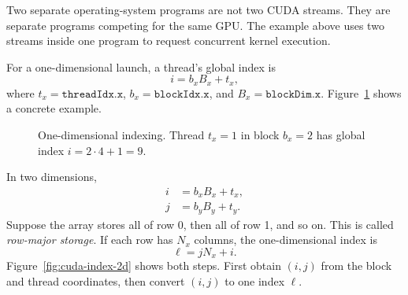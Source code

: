\documentclass[11pt]{article}
\numberwithin{equation}{section}
\numberwithin{figure}{section}
\numberwithin{table}{section}
\newcommand{\code}[1]{\texttt{#1}}
\begin{document}
Two separate operating-system programs are not two CUDA streams.  They are separate
programs competing for the same GPU.  The example above uses two streams inside one
program to request concurrent kernel execution.

For a one-dimensional launch, a thread's global index is
\begin{equation}
  i=b_xB_x+t_x,
  \label{eq:chapter-global-index-1d}
\end{equation}
where $t_x=\code{threadIdx.x}$, $b_x=\code{blockIdx.x}$, and
$B_x=\code{blockDim.x}$.  Figure~\ref{fig:cuda-index-1d} shows a concrete
example.

\begin{figure}[htbp]
  \centering
  \caption{One-dimensional indexing.  Thread $t_x=1$ in block $b_x=2$ has
  global index $i=2\cdot4+1=9$.}
  \label{fig:cuda-index-1d}
\end{figure}

\FloatBarrier

In two dimensions,
\begin{align}
  i &= b_xB_x+t_x, \\
  j &= b_yB_y+t_y.
  \label{eq:chapter-global-index-2d}
\end{align}
Suppose the array stores all of row 0, then all of row 1, and so on.  This is called
\emph{row-major storage}.  If each row has $N_x$ columns, the one-dimensional index
is
\begin{equation}
  \ell=jN_x+i.
  \label{eq:row-major-index}
\end{equation}
Figure~\ref{fig:cuda-index-2d} shows both steps.  First obtain $(i,j)$ from the
block and thread coordinates, then convert $(i,j)$ to one index $\ell$.
\end{document}
